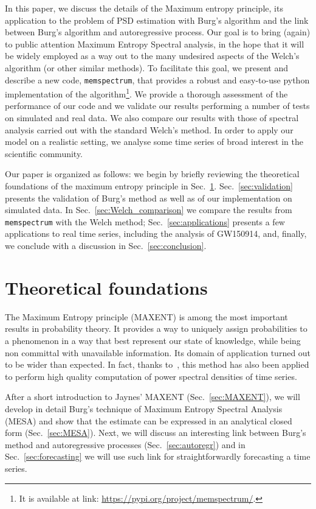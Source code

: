 \documentclass{aa}
\begin{document}
In this paper, we discuss the details of the Maximum entropy principle, its application to the problem of PSD estimation with Burg's algorithm and the link between Burg's algorithm and autoregressive process.
Our goal is to bring (again) to public attention Maximum Entropy Spectral analysis, in the hope that it will be widely employed as a way out to the many undesired aspects of the Welch's algorithm (or other similar methods).
To facilitate this goal, we present and describe a new code, \texttt{memspectrum}, that provides a robust and easy-to-use python implementation of the algorithm\footnote{
It is available at link: \url{https://pypi.org/project/memspectrum/}.
}.
We provide a thorough assessment of the performance of our code and we validate our results performing a number of tests on simulated and real data.
We also compare our results with those of spectral analysis carried out with the standard Welch's method.
In order to apply our model on a realistic setting, we analyse some time series of broad interest in the scientific community.

Our paper is organized as follows: we begin by briefly reviewing the theoretical foundations of the maximum entropy principle in Sec.~\ref{sec:foundations}. Sec.~\ref{sec:validation} presents the validation of Burg's method as well as of our implementation on simulated data. In Sec.~\ref{sec:Welch_comparison} we compare the results from \texttt{memspectrum} with the Welch method; Sec.~\ref{sec:applications} presents a few applications to real time series, including the analysis of GW150914, and, finally, we conclude with a discussion in Sec.~\ref{sec:conclusion}.


\section{Theoretical foundations}\label{sec:foundations}
The Maximum Entropy principle (MAXENT) is among the most important results in probability theory. It provides a way to uniquely assign probabilities to a phenomenon in a way that best represent our state of knowledge, while being non committal with unavailable information. Its domain of application turned out to be wider than expected. In fact, thanks to~\citet{burg1975maximum}, this method has also been applied to perform high quality computation of power spectral densities of time series.

After a short introduction to Jaynes' MAXENT (Sec.~\ref{sec:MAXENT}), we will develop in detail Burg's technique of Maximum Entropy Spectral Analysis (MESA) and show that the estimate can be expressed in an analytical closed form (Sec.~\ref{sec:MESA}).
Next, we will discuss an interesting link between Burg's method and autoregressive processes (Sec.~\ref{sec:autoregr}) and in Sec.~\ref{sec:forecasting} we will use such link for straightforwardly forecasting a time series.
\end{document}
